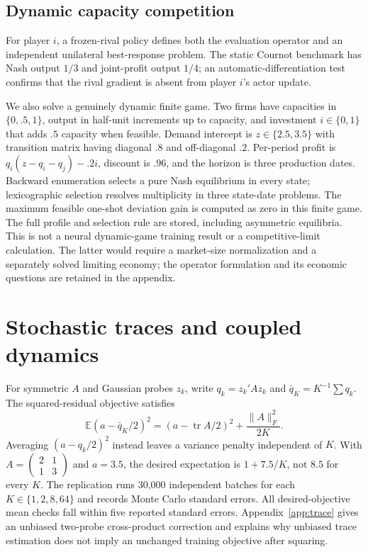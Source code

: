 \subsection{Dynamic capacity competition}
For player $i$, a frozen-rival policy defines both the evaluation operator and an independent unilateral best-response problem. The static Cournot benchmark has Nash output $1/3$ and joint-profit output $1/4$; an automatic-differentiation test confirms that the rival gradient is absent from player $i$'s actor update.

We also solve a genuinely dynamic finite game. Two firms have capacities in $\{0,.5,1\}$, output in half-unit increments up to capacity, and investment $i\in\{0,1\}$ that adds $.5$ capacity when feasible. Demand intercept is $z\in\{2.5,3.5\}$ with transition matrix having diagonal $.8$ and off-diagonal $.2$. Per-period profit is $q_i(z-q_i-q_j)-.2i$, discount is $.96$, and the horizon is three production dates. Backward enumeration selects a pure Nash equilibrium in every state; lexicographic selection resolves multiplicity in three state-date problems. The maximum feasible one-shot deviation gain is computed as zero in this finite game. The full profile and selection rule are stored, including asymmetric equilibria. This is not a neural dynamic-game training result or a competitive-limit calculation. The latter would require a market-size normalization and a separately solved limiting economy; the operator formulation and its economic questions are retained in the appendix.

\section{Stochastic traces and coupled dynamics}
\label{sec:trace}
For symmetric $A$ and Gaussian probes $z_k$, write $q_k=z_k'Az_k$ and $\bar q_K=K^{-1}\sum q_k$. The squared-residual objective satisfies
\begin{equation}
\mathbb E(a-\bar q_K/2)^2=(a-\operatorname{tr}A/2)^2+\frac{\|A\|_F^2}{2K}.
\label{eq:trace}
\end{equation}
Averaging $(a-q_k/2)^2$ instead leaves a variance penalty independent of $K$. With $A=\left(\begin{smallmatrix}2&1\\1&3\end{smallmatrix}\right)$ and $a=3.5$, the desired expectation is $1+7.5/K$, not $8.5$ for every $K$. The replication runs 30,000 independent batches for each $K\in\{1,2,8,64\}$ and records Monte Carlo standard errors. All desired-objective mean checks fall within five reported standard errors. Appendix~\ref{app:trace} gives an unbiased two-probe cross-product correction and explains why unbiased trace estimation does not imply an unchanged training objective after squaring.

